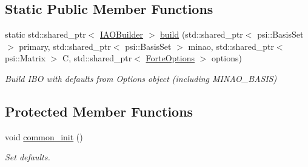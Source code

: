 \subsection*{Static Public Member Functions}
\begin{DoxyCompactItemize}
\item 
static std\+::shared\+\_\+ptr$<$ \mbox{\hyperlink{classforte_1_1_i_a_o_builder}{I\+A\+O\+Builder}} $>$ \mbox{\hyperlink{classforte_1_1_i_a_o_builder_aed0160437e3de1eebfdd5c140727501d}{build}} (std\+::shared\+\_\+ptr$<$ psi\+::\+Basis\+Set $>$ primary, std\+::shared\+\_\+ptr$<$ psi\+::\+Basis\+Set $>$ minao, std\+::shared\+\_\+ptr$<$ psi\+::\+Matrix $>$ C, std\+::shared\+\_\+ptr$<$ \mbox{\hyperlink{classforte_1_1_forte_options}{Forte\+Options}} $>$ options)
\begin{DoxyCompactList}\small\item\em Build I\+BO with defaults from Options object (including M\+I\+N\+A\+O\+\_\+\+B\+A\+S\+IS) \end{DoxyCompactList}\end{DoxyCompactItemize}
\subsection*{Protected Member Functions}
\begin{DoxyCompactItemize}
\item 
void \mbox{\hyperlink{classforte_1_1_i_a_o_builder_aa162eef954857bb49653ef276b99c003}{common\+\_\+init}} ()
\begin{DoxyCompactList}\small\item\em Set defaults. \end{DoxyCompactList}\end{DoxyCompactItemize}
